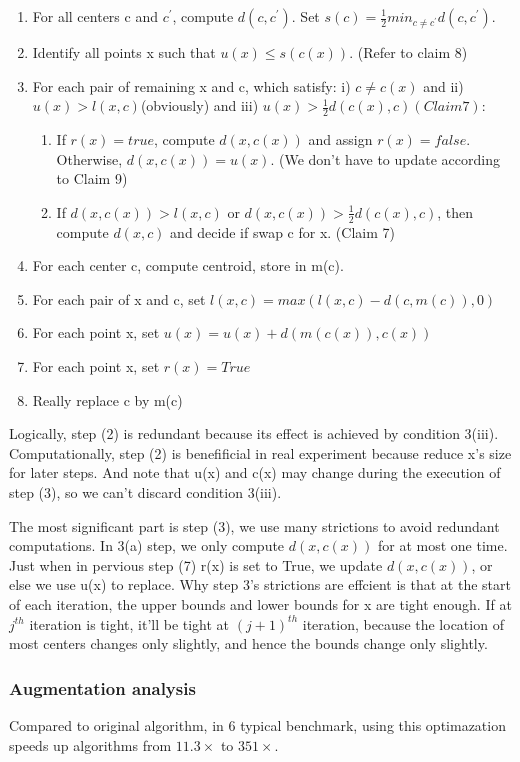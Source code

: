 \documentclass[11pt]{article}
\begin{document}
\begin{enumerate}
\item For all centers c and $c^{\prime}$, compute $d(c, c^{\prime})$. Set $s(c) = \frac{1}{2}min_{c \ne c^{\prime}}d(c,c^{\prime})$.
\item Identify all points x such that $u(x) \le s(c(x))$. (Refer to claim 8)
\item For each pair of remaining x and c, which satisfy: i) $c \ne c(x)$ and ii) $u(x) > l(x,c)$(obviously) and iii) $u(x) > \frac{1}{2}d(c(x), c)(Claim 7)$: 
\begin{enumerate}
\item If $r(x) = true$, compute $d(x,c(x))$ and assign $r(x)=false$. Otherwise, $d(x,c(x)) = u(x).$ (We don't have to update according to Claim 9)
\item  If $d(x,c(x))> l(x,c)$ or $d(x,c(x)) > \frac{1}{2}d(c(x), c)$, then compute $d(x,c)$ and decide if swap c for x. (Claim 7)
\end{enumerate}
\item For each center c, compute centroid, store in m(c).
\item For each  pair of x and c, set $l(x,c) = max(l(x,c) - d(c,m(c)), 0)$
\item For each point x, set $u(x) = u(x) + d(m(c(x)), c(x))$
\item For each point x, set $r(x) = True$
\item Really replace c by m(c)
\end{enumerate}

Logically, step (2) is redundant because its effect is achieved by condition 3(iii). Computationally, step (2) is benefificial in real experiment because reduce x's size for later steps. And note that u(x) and c(x) may change during the execution of step (3), so we can't discard condition 3(iii).\par
The most significant part is step (3), we use many strictions to avoid redundant computations. In 3(a) step, we only compute $d(x,c(x))$ for at most one time. Just when in pervious step (7) r(x) is set to True, we update  $d(x,c(x))$, or else we use u(x) to replace. Why step 3's strictions are effcient is that at the start of each iteration, the upper bounds and lower bounds for x are tight enough. If at $j^{th}$ iteration is tight, it'll be tight at $(j+1)^{th}$ iteration, because the location of most centers changes only slightly, and hence the bounds change only slightly. \par

\subsubsection{Augmentation analysis}
Compared to original algorithm, in 6 typical benchmark, using this optimazation speeds up algorithms from $ 11.3 \times$ to $  351 \times$.
\end{document}

